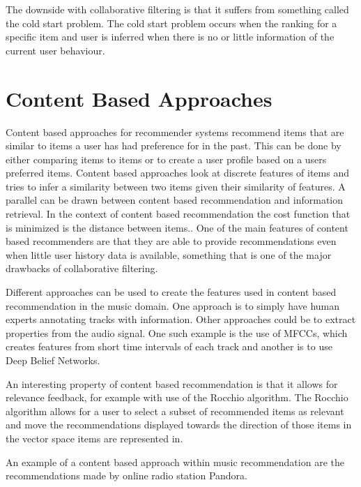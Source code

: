 \documentclass[a4paper,11pt]{kth-mag}
\begin{document}
The downside with collaborative filtering is that it suffers from something called the cold start problem. The cold start problem occurs when the ranking for a specific item and user is inferred when there is no or little information of the current user behaviour\cite{herlocker2004evaluating}.

\section{Content Based Approaches}
Content based approaches for recommender systems recommend items that are similar to items  a user has had preference for in the past. This can be done by either comparing items to items or to create a user profile based on a users preferred items\cite{adomavicius2005toward}. Content based approaches look at discrete features of items and tries to infer a similarity between two items given their similarity of features. A parallel can be drawn between content based recommendation and information retrieval. In the context of content based recommendation the cost function that is minimized is the distance between items.\cite{adomavicius2005toward}. One of the main features of content based recommenders are that they are able to provide recommendations even when little user history data is available, something that is one of the major drawbacks of collaborative filtering\cite{gunawardana2009unified}.

Different approaches can be used to create the features used in content based recommendation in the music domain. One approach is to simply have human experts annotating tracks with information\cite{musicGenome}\cite{tzanetakis2002musical}. Other approaches could be to extract properties from the audio signal. One such example is the use of MFCCs, which creates features from short time intervals of each track\cite{logan2000mel} and another is to use Deep Belief Networks\cite{hamel2010learning}.

An interesting property of content based recommendation is that it allows for relevance feedback, for example with use of the Rocchio algorithm. The Rocchio algorithm allows for a user to select a subset of recommended items as relevant and move the recommendations displayed towards the direction of those items in the vector space items are represented in\cite{pazzani2007content}.

An example of a content based approach within music recommendation are the recommendations made by online radio station Pandora. 
\end{document}
